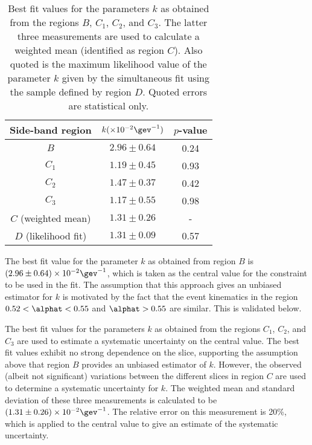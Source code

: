 \begin{table}[!h]
  \caption{\label{tab:expo-qcd-fits} Best fit values for the
    parameters $k$ as obtained from the regions $B$, $C_1$, $C_2$, and
    $C_3$. The latter three measurements are used to calculate a
    weighted mean (identified as region $C$). Also quoted is the
    maximum likelihood value of the parameter $k$ given by the
    simultaneous fit using the sample defined by region $D$. Quoted
    errors are statistical only.}
  \centering
  \footnotesize
  \begin{tabular}{ ccc }
    \hline
    Side-band region     & $k (\times 10^{-2}\gev^{-1})$ & $p$-value \\ [0.5ex]
    \hline                            
    $B$                  & $2.96\pm0.64$                 & 0.24      \\ 
    $C_1$                & $1.19\pm0.45$                 & 0.93      \\ 
    $C_2$                & $1.47\pm0.37$                 & 0.42      \\ 
    $C_3$                & $1.17\pm0.55$                 & 0.98      \\ 
    \hline                            
    $C$ (weighted mean)  & $1.31\pm0.26$                 & -         \\ 
    $D$ (likelihood fit) & $1.31\pm0.09$                 & 0.57      \\
    \hline
  \end{tabular}
\end{table}

The best fit value for the parameter $k$ as obtained from region $B$
is $(2.96\pm0.64) \times 10^{-2}\gev^{-1}$, which is taken as the
central value for the constraint to be used in the fit. The assumption
that this approach gives an unbiased estimator for $k$ is motivated by
the fact that the event kinematics in the region $0.52 < \alphat <
0.55$ and $\alphat > 0.55$ are similar. This is validated below.

The best fit values for the parameters $k$ as obtained from the
regions $C_1$, $C_2$, and $C_3$ are used to estimate a systematic
uncertainty on the central value. The best fit values exhibit no
strong dependence on the \alphat slice, supporting the assumption
above that region $B$ provides an unbiased estimator of $k$. However,
the observed (albeit not significant) variations between the different
\alphat slices in region $C$ are used to determine a systematic
uncertainty for $k$. The weighted mean and standard deviation of these
three measurements is calculated to be $(1.31\pm0.26) \times
10^{-2}\gev^{-1}$. The relative error on this measurement is 20\%,
which is applied to the central value to give an estimate of the
systematic uncertainty.

